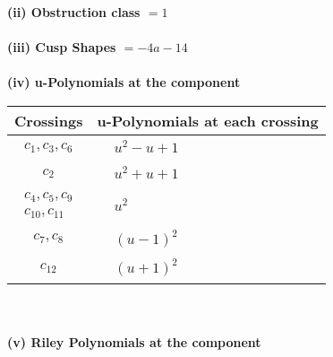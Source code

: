 \documentclass[1p]{elsarticle_modified}
\theoremstyle{definition}
\begin{document}
\flushleft \textbf{(ii) Obstruction class $= 1$}\\~\\
\flushleft \textbf{(iii) Cusp Shapes $= -4 a-14$}\\~\\
\newpage\renewcommand{\arraystretch}{1}
\flushleft \textbf{(iv) u-Polynomials at the component}\newline \\
\begin{tabular}{m{50pt}|m{274pt}}
Crossings & \hspace{64pt}u-Polynomials at each crossing \\
\hline $$\begin{aligned}c_{1},c_{3},c_{6}\end{aligned}$$&$\begin{aligned}
&u^2- u+1
\end{aligned}$\\
\hline $$\begin{aligned}c_{2}\end{aligned}$$&$\begin{aligned}
&u^2+u+1
\end{aligned}$\\
\hline $$\begin{aligned}c_{4},c_{5},c_{9}\\c_{10},c_{11}\end{aligned}$$&$\begin{aligned}
&u^2
\end{aligned}$\\
\hline $$\begin{aligned}c_{7},c_{8}\end{aligned}$$&$\begin{aligned}
&(u-1)^2
\end{aligned}$\\
\hline $$\begin{aligned}c_{12}\end{aligned}$$&$\begin{aligned}
&(u+1)^2
\end{aligned}$\\
\hline
\end{tabular}\\~\\
\newpage\renewcommand{\arraystretch}{1}
\flushleft \textbf{(v) Riley Polynomials at the component}\newline \\
\end{document}
